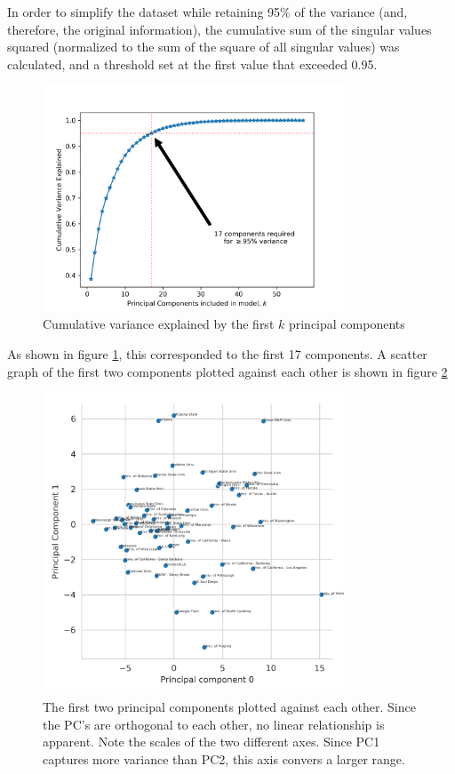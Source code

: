 \documentclass{article}
\begin{document}
	In order to simplify the dataset while retaining 95\% of the variance (and, therefore, the original 
	information), the cumulative sum of the singular values squared (normalized to the sum of the square 
	of all singular values) was calculated, and a threshold set at the first value that exceeded \num{0.95}.
	
	\begin{figure}[h]
		\centering
		\includegraphics[width=0.8\textwidth]{cumulative_explained_variance}
		\caption{Cumulative variance explained by the first $k$ principal components}
		\label{fig:cumulative_explained_variance}
	\end{figure}
	
	As shown in figure \ref{fig:cumulative_explained_variance}, this corresponded to the first \num{17} 
	components. A scatter graph of the first two components plotted against each other is shown in 
	figure \ref{fig:pc1_vs_pc2}
	
	\begin{figure}[h]
		\centering
		\includegraphics[width=0.8\textwidth]{pc1_v_pc2}
		\caption{The first two principal components plotted against each other. Since the PC's are 
				 orthogonal to each other, no linear relationship is apparent. Note the scales of the 
				 two different axes. Since PC1 captures more variance than PC2, this axis convers a 
				 larger range.}
		\label{fig:pc1_vs_pc2}
	\end{figure}
	
\end{document}
